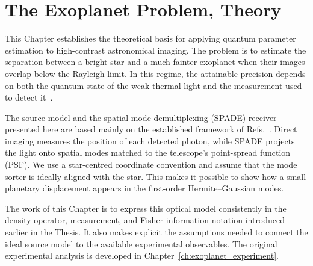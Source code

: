 \chapter{The Exoplanet Problem, Theory}
\label{ch:astrophysical_theory}

This Chapter establishes the theoretical basis for applying quantum parameter estimation to high-contrast astronomical imaging.  The problem is to estimate the separation between a bright star and a much fainter exoplanet when their images overlap below the Rayleigh limit.  In this regime, the attainable precision depends on both the quantum state of the weak thermal light and the measurement used to detect it~\cite{Tsang2016quantum}.

The source model and the spatial-mode demultiplexing (SPADE) receiver presented here are based mainly on the established framework of Refs.~\cite{Santamaria2024single,Tsang2016quantum}.  Direct imaging measures the position of each detected photon, while SPADE projects the light onto spatial modes matched to the telescope's point-spread function (PSF).  We use a star-centred coordinate convention and assume that the mode sorter is ideally aligned with the star.  This makes it possible to show how a small planetary displacement appears in the first-order Hermite--Gaussian modes.

The work of this Chapter is to express this optical model consistently in the density-operator, measurement, and Fisher-information notation introduced earlier in the Thesis.  It also makes explicit the assumptions needed to connect the ideal source model to the available experimental observables.  The original experimental analysis is developed in Chapter~\ref{ch:exoplanet_experiment}.

